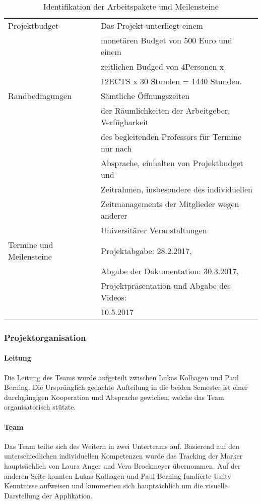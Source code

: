 \begin{table}
\begin{tabularx}{\textwidth}{|l|l|}
\hline
	Projektbudget & Das Projekt unterliegt einem\\
	& monetären Budget von 500 Euro und einem\\
	& zeitlichen Budged von 4Personen x \\
	&12ECTS x 30 Stunden = 1440 Stunden.\\
	\hline
	Randbedingungen & Sämtliche Öffnungszeiten\\
	& der Räumlichkeiten der Arbeitgeber, Verfügbarkeit\\
	& des begleitenden Professors für Termine nur nach \\
	&Absprache, einhalten von Projektbudget und \\
	&Zeitrahmen, insbesondere des individuellen \\
	&Zeitmanagements der Mitglieder wegen anderer\\
	& Universitärer Veranstaltungen\\
	\hline
	Termine und Meilensteine & Projektabgabe: 28.2.2017, \\
	&Abgabe der Dokumentation: 30.3.2017, \\
	&Projektpräsentation und Abgabe des Videos: \\
	&10.5.2017\\
	\hline

	\end{tabularx}
	\caption{Identifikation der Arbeitspakete und Meilensteine}
	\label{tab:Projektformular}
\end{table}

\subsubsection{Projektorganisation}
\paragraph{Leitung} Die Leitung des Teams wurde aufgeteilt zwischen Lukas Kolhagen und Paul Berning. Die Ursprünglich gedachte Aufteilung in die beiden Semester ist einer durchgängigen Kooperation und Absprache gewichen, welche das Team organisatorisch stützte.
\paragraph{Team} Das Team teilte sich des Weitern in zwei Unterteams auf. Basierend auf den unterschiedlichen individuellen Kompetenzen wurde das Tracking der Marker hauptsächlich von Laura Anger und Vera Brockmeyer übernommen. Auf der anderen Seite konnten Lukas Kolhagen und Paul Berning fundierte Unity Kenntnisse aufweisen und kümmerten sich hauptsächlich um die visuelle Darstellung der Applikation.

